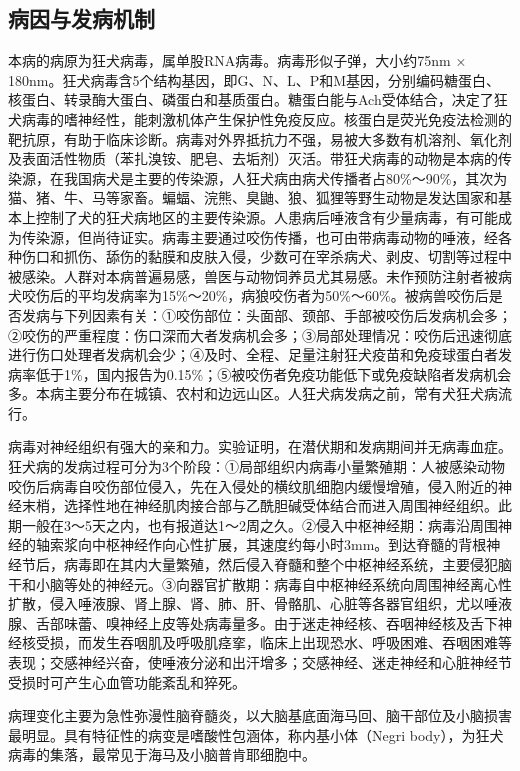 \subsection{病因与发病机制}

本病的病原为狂犬病毒，属单股RNA病毒。病毒形似子弹，大小约75nm ×
180nm。狂犬病毒含5个结构基因，即G、N、L、P和M基因，分别编码糖蛋白、核蛋白、转录酶大蛋白、磷蛋白和基质蛋白。糖蛋白能与Ach受体结合，决定了狂犬病毒的嗜神经性，能刺激机体产生保护性免疫反应。核蛋白是荧光免疫法检测的靶抗原，有助于临床诊断。病毒对外界抵抗力不强，易被大多数有机溶剂、氧化剂及表面活性物质（苯扎溴铵、肥皂、去垢剂）灭活。带狂犬病毒的动物是本病的传染源，在我国病犬是主要的传染源，人狂犬病由病犬传播者占80\%～90\%，其次为猫、猪、牛、马等家畜。蝙蝠、浣熊、臭鼬、狼、狐狸等野生动物是发达国家和基本上控制了犬的狂犬病地区的主要传染源。人患病后唾液含有少量病毒，有可能成为传染源，但尚待证实。病毒主要通过咬伤传播，也可由带病毒动物的唾液，经各种伤口和抓伤、舔伤的黏膜和皮肤入侵，少数可在宰杀病犬、剥皮、切割等过程中被感染。人群对本病普遍易感，兽医与动物饲养员尤其易感。未作预防注射者被病犬咬伤后的平均发病率为15\%～20\%，病狼咬伤者为50\%～60\%。被病兽咬伤后是否发病与下列因素有关：①咬伤部位：头面部、颈部、手部被咬伤后发病机会多；②咬伤的严重程度：伤口深而大者发病机会多；③局部处理情况：咬伤后迅速彻底进行伤口处理者发病机会少；④及时、全程、足量注射狂犬疫苗和免疫球蛋白者发病率低于1\%，国内报告为0.15\%；⑤被咬伤者免疫功能低下或免疫缺陷者发病机会多。本病主要分布在城镇、农村和边远山区。人狂犬病发病之前，常有犬狂犬病流行。

病毒对神经组织有强大的亲和力。实验证明，在潜伏期和发病期间并无病毒血症。狂犬病的发病过程可分为3个阶段：①局部组织内病毒小量繁殖期：人被感染动物咬伤后病毒自咬伤部位侵入，先在入侵处的横纹肌细胞内缓慢增殖，侵入附近的神经末梢，选择性地在神经肌肉接合部与乙酰胆碱受体结合而进入周围神经组织。此期一般在3～5天之内，也有报道达1～2周之久。②侵入中枢神经期：病毒沿周围神经的轴索浆向中枢神经作向心性扩展，其速度约每小时3mm。到达脊髓的背根神经节后，病毒即在其内大量繁殖，然后侵入脊髓和整个中枢神经系统，主要侵犯脑干和小脑等处的神经元。③向器官扩散期：病毒自中枢神经系统向周围神经离心性扩散，侵入唾液腺、肾上腺、肾、肺、肝、骨骼肌、心脏等各器官组织，尤以唾液腺、舌部味蕾、嗅神经上皮等处病毒量多。由于迷走神经核、吞咽神经核及舌下神经核受损，而发生吞咽肌及呼吸肌痉挛，临床上出现恐水、呼吸困难、吞咽困难等表现；交感神经兴奋，使唾液分泌和出汗增多；交感神经、迷走神经和心脏神经节受损时可产生心血管功能紊乱和猝死。

病理变化主要为急性弥漫性脑脊髓炎，以大脑基底面海马回、脑干部位及小脑损害最明显。具有特征性的病变是嗜酸性包涵体，称内基小体（Negri
body），为狂犬病毒的集落，最常见于海马及小脑普肯耶细胞中。

